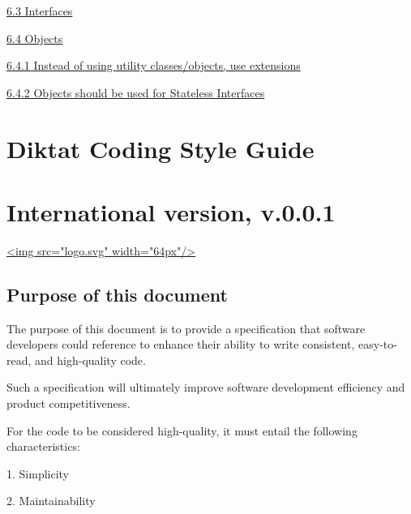 \hspace{0.5cm}\hyperref[sec:6.3]{ 6.3 Interfaces}

\hspace{0.5cm}\hyperref[sec:6.4]{ 6.4 Objects}

\hspace{1.0cm}\hyperref[sec:6.4.1]{ 6.4.1 Instead of using utility classes/objects, use extensions}

\hspace{1.0cm}\hyperref[sec:6.4.2]{ 6.4.2 Objects should be used for Stateless Interfaces}

\hspace{0.0cm}\hyperref[sec:]{}

\hspace{0.0cm}\hyperref[sec:]{}

\section*{Diktat Coding Style Guide}

\section*{International version, v.0.0.1}

\hspace{0.0cm}\hyperref[sec:]{}

\hspace{0.0cm}\hyperref[sec:]{<img src="logo.svg" width="64px"/>}

\hspace{0.0cm}\hyperref[sec:]{}

\subsection*{\textbf{Purpose of this document}}

\label{sec:}



The purpose of this document is to provide a specification that software developers could reference to enhance their ability to write consistent, easy-to-read, and high-quality code.

Such a specification will ultimately improve software development efficiency and product competitiveness.

For the code to be considered high-quality, it must entail the following characteristics:

1.	Simplicity

2.	Maintainability


